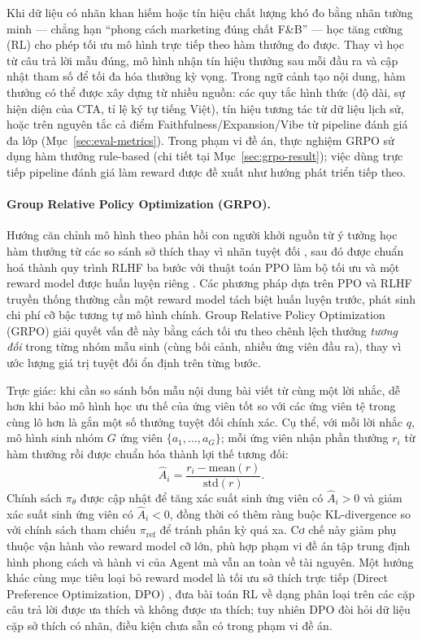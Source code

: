 Khi dữ liệu có nhãn khan hiếm hoặc tín hiệu chất lượng khó đo
bằng nhãn tường minh --- chẳng hạn ``phong cách marketing đúng chất
F\&B'' --- học tăng cường (RL)  cho phép tối ưu mô hình trực tiếp theo
hàm thưởng đo được. Thay vì học từ câu trả lời mẫu đúng, mô hình
nhận tín hiệu thưởng sau mỗi đầu ra và cập nhật tham số để tối đa hóa
thưởng kỳ vọng. Trong ngữ cảnh tạo nội dung, hàm thưởng có thể được
xây dựng từ nhiều nguồn: các quy tắc hình thức (độ dài, sự hiện diện
của CTA, tỉ lệ ký tự tiếng Việt), tín hiệu tương tác từ dữ liệu lịch
sử, hoặc trên nguyên tắc cả điểm Faithfulness/Expansion/Vibe từ
pipeline đánh giá đa lớp (Mục~\ref{sec:eval-metrics}). Trong phạm vi
đề án, thực nghiệm GRPO sử dụng hàm thưởng rule-based (chi tiết
tại Mục~\ref{sec:grpo-result}); việc dùng trực tiếp pipeline đánh giá
làm reward được đề xuất như hướng phát triển tiếp theo.

\paragraph{Group Relative Policy Optimization (GRPO).}
Hướng căn chỉnh mô hình theo phản hồi con người khởi nguồn từ ý tưởng học
hàm thưởng từ các so sánh sở thích thay vì nhãn tuyệt đối
, sau đó được chuẩn hoá thành quy trình RLHF
ba bước với thuật toán PPO  làm bộ tối ưu và một
reward model được huấn luyện riêng .
Các phương pháp dựa trên PPO và RLHF truyền thống thường cần một reward
model tách biệt huấn luyện trước, phát sinh chi phí cỡ bậc tương tự mô
hình chính. Group Relative Policy Optimization (GRPO) 
giải quyết vấn đề
này bằng cách tối ưu theo chênh lệch thưởng \emph{tương đối} trong từng
nhóm mẫu sinh (cùng bối cảnh, nhiều ứng viên đầu ra), thay vì ước lượng
giá trị tuyệt đối ổn định trên từng bước.

Trực giác: khi cần so sánh bốn mẫu nội dung bài viết từ cùng một lời
nhắc, dễ hơn khi bảo mô hình học ưu thế của ứng viên tốt so với các
ứng viên tệ trong cùng lô hơn là gắn một số thưởng tuyệt đối chính xác.
Cụ thể, với mỗi lời nhắc $q$, mô hình sinh nhóm $G$ ứng viên
$\{a_1,\ldots,a_G\}$; mỗi ứng viên nhận phần thưởng $r_i$ từ hàm thưởng
rồi được chuẩn hóa thành lợi thế tương đối:
\begin{equation}
    \hat{A}_i = \frac{r_i - \mathrm{mean}(r)}{\mathrm{std}(r)}.
\end{equation}
Chính sách $\pi_\theta$ được cập nhật để tăng xác suất sinh ứng viên có
$\hat{A}_i > 0$ và giảm xác suất sinh ứng viên có $\hat{A}_i < 0$, đồng
thời có thêm ràng buộc KL-divergence so với chính sách tham chiếu
$\pi_{\mathrm{ref}}$ để tránh phân kỳ quá xa. Cơ chế này giảm phụ thuộc
vận hành vào reward model cỡ lớn, phù hợp phạm vi đề án tập trung
định hình phong cách và hành vi của Agent mà vẫn an toàn về tài nguyên.
Một hướng khác cùng mục tiêu loại bỏ reward model là tối ưu sở thích trực
tiếp (Direct Preference Optimization, DPO) , đưa
bài toán RL về dạng phân loại trên các cặp câu trả lời được ưa thích và
không được ưa thích; tuy nhiên DPO đòi hỏi dữ liệu cặp sở thích có nhãn,
điều kiện chưa sẵn có trong phạm vi đề án.


